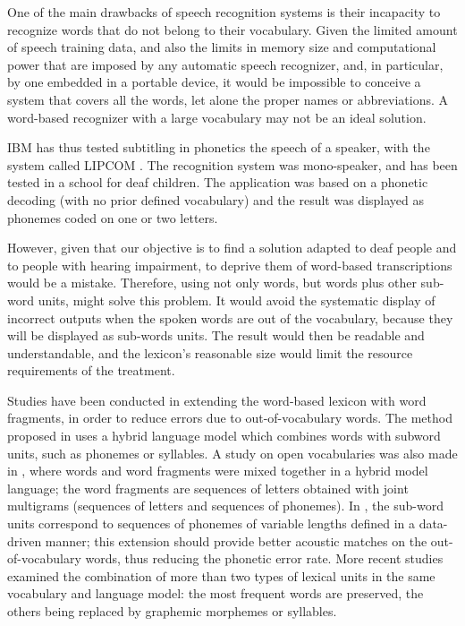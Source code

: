 \documentclass[a4paper]{article}
\begin{document}
One of the main drawbacks of speech recognition systems is their incapacity to recognize words that do not belong to their vocabulary. Given the limited amount of speech training data, and also the limits in memory size and computational power that are imposed by any automatic speech recognizer, and, in particular, by one embedded in a portable device, it would be impossible to conceive a system that covers all the words, let alone the proper names or abbreviations. A word-based recognizer with a large vocabulary may not be an ideal solution.

IBM has thus tested subtitling in phonetics the speech of a speaker, with the system called LIPCOM \cite{Coursant1999}. The recognition system was mono-speaker, and has been tested in a school for deaf children. The application was based on a phonetic decoding (with no prior defined vocabulary) and the result was displayed as phonemes coded on one or two letters.

However, given that our objective is to find a solution adapted to deaf people and to people with hearing impairment, to deprive them of word-based transcriptions would be a mistake. Therefore, using not only words, but words plus other sub-word units, might solve this problem. It would avoid the systematic display of incorrect outputs when the spoken words are out of the vocabulary, because they will be displayed as sub-words units. The result would then be readable and understandable, and the lexicon's reasonable size would limit the resource requirements of the treatment.

Studies have been conducted in extending the word-based lexicon with word fragments, in order to reduce errors due to out-of-vocabulary words.
The method proposed in \cite{Yazgan2004} uses a hybrid language model which combines words with subword units, such as phonemes or syllables.
A study on open vocabularies was also made in \cite{Bisani2005}, where words and word fragments were mixed together in a hybrid model language; the word fragments are sequences of letters obtained with joint multigrams (sequences of letters and sequences of phonemes).
In \cite{Rastrow2009}, the sub-word units correspond to sequences of phonemes of variable lengths defined in a data-driven manner; this extension should provide better acoustic matches on the out-of-vocabulary words, thus reducing the phonetic error rate.
More recent studies \cite{shaik2011} examined the combination of more than two types of lexical units in the same vocabulary and language model: the most frequent words are preserved, the others being replaced by graphemic morphemes or syllables.
\end{document}
